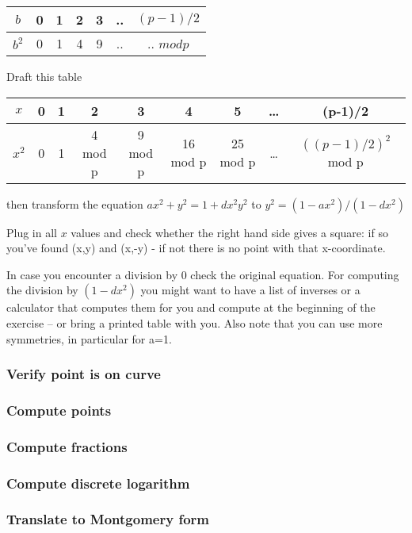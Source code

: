 \documentclass{article}
\begin{document}
\begin{tabular}{|c|c|c|c|c|c|c|}
\hline 
$b$ & 0 & 1 & 2 & 3 & .. & $(p-1)/2$ \\ 
\hline 
$b^2$ & 0 & 1 & 4 & 9 & ..  & .. $mod p$ \\ 
\hline 
\end{tabular}


Draft this table
\begin{tabular}{|c|c|c|c|c|c|c|c|c|}
\hline
$x $ & 0 & 1 & 2 & 3 & 4 & 5 & \ldots & (p-1)/2 \\
\hline
$x^2 $ & 0 & 1 & 4 mod p & 9 mod p & 16 mod p & 25 mod p & \ldots & $((p-1)/2)^2$ mod p \\
\hline
\end{tabular}

then transform the equation $ax^2+y^2=1+dx^2y^2$
to $y^2=(1-ax^2)/(1-dx^2)$

Plug in all $x$ values and check whether the right hand side gives a square: if
so you've found (x,y) and (x,-y) - if not there is no point with that
x-coordinate.

In case you encounter a division by 0 check the original equation. For
computing the division by $(1-dx^2)$ you might want to have a list of inverses or
a calculator that computes them for you and compute at the beginning of the
exercise -- or bring a printed table with you. Also note that you can use more
symmetries, in particular for a=1.

\subsubsection{Verify point is on curve}
\subsubsection{Compute points}
\subsubsection{Compute fractions}
\subsubsection{Compute discrete logarithm}
\subsubsection{Translate to Montgomery form}
\end{document}
